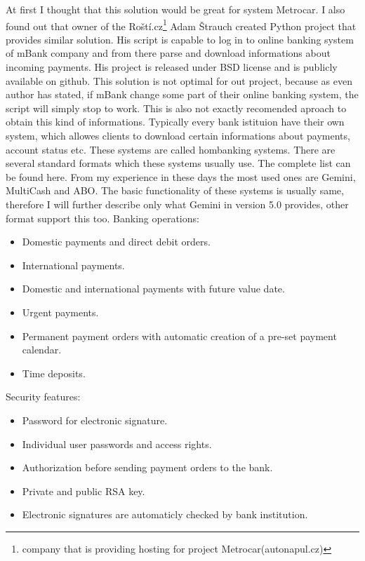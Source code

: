 \documentclass[11pt,twoside,a4paper]{book}
\begin{document}
At first I thought that this solution would be great for system Metrocar. I also found out that owner of the Roští.cz\footnote{company that is providing hosting for project Metrocar(autonapul.cz)} Adam Štrauch created Python project that provides similar solution. His script is capable to log in to online banking system of mBank company and from there parse and download informations about incoming payments. His project is released under BSD license and is publicly available on github\cite{python-mbank}. This solution is not optimal for out project, because as even author has stated, if mBank change some part of their 
online banking system, the script will simply stop to work. This is also not exactly recomended aproach to obtain this kind of 
informations. Typically every bank istituion have their own system, which allowes clients to download certain informations about payments, account status etc. These systems are called hombanking systems. There are several standard formats which 
these systems usually use. The complete list can be found here\cite{hombanking}. From my experience in these days the most used ones are Gemini, MultiCash and ABO. The basic functionality of these systems is usually same, therefore I will further describe only what Gemini in version 5.0 provides, other format support this too. 
Banking operations:
\begin{itemize}
 \item Domestic payments and direct debit orders.
 \item International payments.
 \item Domestic and international payments with future value date.
 \item Urgent payments.
 \item Permanent payment orders with automatic creation of a pre-set payment calendar.
 \item Time deposits.
\end{itemize}

Security features:
\begin{itemize}
	\item Password for electronic signature.
	\item Individual user passwords and access rights.
	\item Authorization before sending payment orders to the bank.
	\item Private and public RSA key.
	\item Electronic signatures are automaticly checked by bank institution.
\end{itemize}
\end{document}
